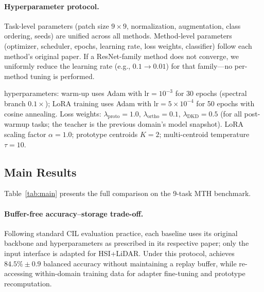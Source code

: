 \paragraph{Hyperparameter protocol.}
Task-level parameters (patch size $9{\times}9$, normalization, augmentation, class ordering, seeds) are unified across all methods.
Method-level parameters (optimizer, scheduler, epochs, learning rate, loss weights, classifier) follow each method's original paper.
If a ResNet-family method does not converge, we uniformly reduce the learning rate (e.g., $0.1 \to 0.01$) for that family---no per-method tuning is performed.

\methodname{} hyperparameters: warm-up uses Adam with $\mathrm{lr}{=}10^{-3}$ for 30 epochs (spectral branch $0.1\times$); LoRA training uses Adam with $\mathrm{lr}{=}5{\times}10^{-4}$ for 50 epochs with cosine annealing.
Loss weights: $\lambda_{\mathrm{proto}}{=}1.0$, $\lambda_{\mathrm{ortho}}{=}0.1$, $\lambda_{\mathrm{DKD}}{=}0.5$ (for all post-warmup tasks; the teacher is the previous domain's model snapshot).
LoRA scaling factor $\alpha{=}1.0$; prototype centroids $K{=}2$; multi-centroid temperature $\tau{=}10$.

\subsection{Main Results}
\label{sec:main_results}

Table~\ref{tab:main} presents the full comparison on the 9-task MTH benchmark.



\paragraph{Buffer-free accuracy--storage trade-off.}
Following standard CIL evaluation practice, each baseline uses its original backbone and hyperparameters as prescribed in its respective paper; only the input interface is adapted for HSI+LiDAR.
Under this protocol, \methodname{} achieves $84.5\% \pm 0.9$ balanced accuracy without maintaining a replay buffer, while re-accessing within-domain training data for adapter fine-tuning and prototype recomputation.

